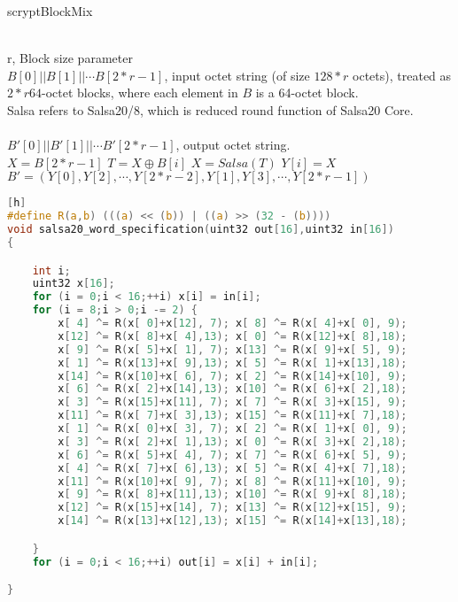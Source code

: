 \begin{algorithm}[tbp]\footnotesize
\caption{scryptBlockMix}
  	\begin{algorithmic}[1]
	    \REQUIRE ~~\\ 
	     r, Block size parameter\\
 		$B[0]||B[1]||\cdots B[2*r-1]$, input octet string (of size $128 * r$ octets), 
 		treated as $2 * r 64$-octet blocks, where each element in $B$ is a 64-octet block.\\
 		Salsa refers to Salsa20/8, which is reduced round function of Salsa20 Core.\\
	    \ENSURE ~~\\
	    $B'[0]||B'[1]||\cdots B'[2*r-1]$, output octet string.\\
	    \STATE $X = B[2*r-1]$
			\STATE $T=X \oplus B[i]$  
			\STATE $X=Salsa(T)$  
			\STATE $Y[i]=X$
		\ENDFOR 
		\RETURN $B'=(Y[0],Y[2],\cdots,Y[2*r-2],Y[1],Y[3],\cdots, Y[2*r-1])$
    \end{algorithmic}
\end{algorithm}

\begin{lstlisting}[language = c, caption = Salsa20/8, label=lst-salsa20core][h]
#define R(a,b) (((a) << (b)) | ((a) >> (32 - (b)))) 
void salsa20_word_specification(uint32 out[16],uint32 in[16]) 
{

	int i; 
	uint32 x[16]; 
	for (i = 0;i < 16;++i) x[i] = in[i]; 
	for (i = 8;i > 0;i -= 2) { 
		x[ 4] ^= R(x[ 0]+x[12], 7); x[ 8] ^= R(x[ 4]+x[ 0], 9);
		x[12] ^= R(x[ 8]+x[ 4],13); x[ 0] ^= R(x[12]+x[ 8],18); 
		x[ 9] ^= R(x[ 5]+x[ 1], 7); x[13] ^= R(x[ 9]+x[ 5], 9); 
		x[ 1] ^= R(x[13]+x[ 9],13); x[ 5] ^= R(x[ 1]+x[13],18); 
		x[14] ^= R(x[10]+x[ 6], 7); x[ 2] ^= R(x[14]+x[10], 9); 
		x[ 6] ^= R(x[ 2]+x[14],13); x[10] ^= R(x[ 6]+x[ 2],18); 
		x[ 3] ^= R(x[15]+x[11], 7); x[ 7] ^= R(x[ 3]+x[15], 9); 
		x[11] ^= R(x[ 7]+x[ 3],13); x[15] ^= R(x[11]+x[ 7],18); 
		x[ 1] ^= R(x[ 0]+x[ 3], 7); x[ 2] ^= R(x[ 1]+x[ 0], 9); 
		x[ 3] ^= R(x[ 2]+x[ 1],13); x[ 0] ^= R(x[ 3]+x[ 2],18); 
		x[ 6] ^= R(x[ 5]+x[ 4], 7); x[ 7] ^= R(x[ 6]+x[ 5], 9); 
		x[ 4] ^= R(x[ 7]+x[ 6],13); x[ 5] ^= R(x[ 4]+x[ 7],18); 
		x[11] ^= R(x[10]+x[ 9], 7); x[ 8] ^= R(x[11]+x[10], 9); 
		x[ 9] ^= R(x[ 8]+x[11],13); x[10] ^= R(x[ 9]+x[ 8],18); 
		x[12] ^= R(x[15]+x[14], 7); x[13] ^= R(x[12]+x[15], 9); 
		x[14] ^= R(x[13]+x[12],13); x[15] ^= R(x[14]+x[13],18);

	}
 	for (i = 0;i < 16;++i) out[i] = x[i] + in[i];

}
\end{lstlisting}

